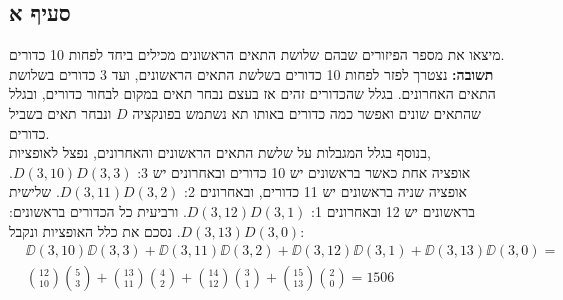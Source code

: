 \documentclass{article}
\begin{document}
	\subsection*{סעיף א}
	מיצאו את מספר הפיזורים שבהם שלושת התאים הראשונים מכילים ביחד לפחות 10 כדורים. \\
	\textbf{תשובה:} נצטרך לפזר לפחות 10 כדורים בשלשת התאים הראשונים, ועד 3 כדורים בשלושת התאים האחרונים.
	בגלל שהכדורים זהים אז בעצם נבחר תאים במקום לבחור כדורים,
	ובגלל שהתאים שונים ואפשר כמה כדורים באותו תא נשתמש בפונקציה $D$ ונבחר תאים בשביל כדורים. \\
	בנוסף בגלל המגבלות על שלשת התאים הראשונים והאחרונים, נפצל לאופציות, \\
	אופציה אחת כאשר בראשונים יש 10 כדורים ובאחרונים יש 3: $D(3, 10)D(3,3)$.
	אופציה שניה בראשונים יש 11 כדורים, ובאחרונים 2: $D(3,11)D(3,2)$.
	שלישית בראשונים יש 12 ובאחרונים 1: $D(3,12)D(3,1)$.
	ורביעית כל הכדורים בראשונים: $D(3,13)D(3,0)$.
	נסכם את כלל האופציות ונקבל:
	\begin{align*}
		&\DD(3, 10)\DD(3,3) + \DD(3,11)\DD(3,2) + \DD(3,12)\DD(3,1) + \DD(3,13)\DD(3,0) = \\
		&{12 \choose 10}{5 \choose 3} + {13 \choose 11}{4 \choose 2} + {14 \choose 12}{3 \choose 1} + {15 \choose 13}{2 \choose 0} =
		1506
	\end{align*}
\end{document}
